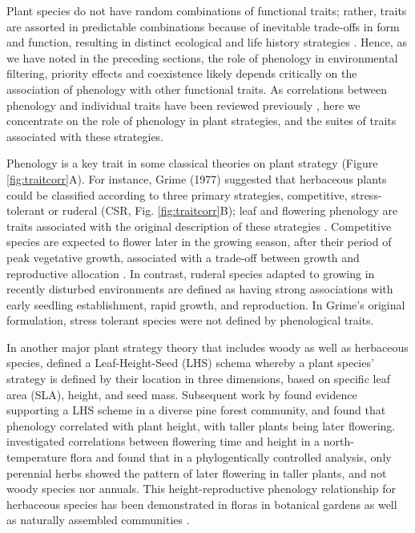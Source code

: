 \documentclass[11pt]{article}
\begin{document}
Plant species do not have random combinations of functional traits; rather, traits are assorted in predictable combinations because of inevitable trade-offs in form and function, resulting in distinct ecological and life history strategies \citep{stearns1998evolution,adler2014functional,westoby2002plant}. Hence, as we have noted in the preceding sections, the role of phenology in environmental filtering, priority effects and coexistence likely depends critically on the association of phenology with other functional traits. As correlations between phenology and individual traits have been reviewed previously \citep[e.g.][]{wolkovich2014aob,segrestin2020reproductive}, here we concentrate on the role of phenology in plant strategies, and the suites of traits associated with these strategies.

Phenology is a key trait in some classical theories on plant strategy (Figure \ref{fig:traitcorr}A). For instance, Grime (1977) suggested that herbaceous plants could be classified according to three primary strategies, competitive, stress-tolerant or ruderal (CSR, Fig. \ref{fig:traitcorr}B); leaf and flowering phenology are traits associated with the original description of these strategies \citep[see Table 2 in][]{grime1977evidence}. Competitive species are expected to flower later in the growing season, after their period of peak vegetative growth, associated with a trade-off between growth and reproductive allocation \citep{law1979cost}. In contrast, ruderal species adapted to growing in recently disturbed environments are defined as having strong associations with early seedling establishment, rapid growth, and reproduction. In Grime’s original formulation, stress tolerant species were not defined by phenological traits.

In another major plant strategy theory that includes woody as well as herbaceous species, \citet{westoby1998leaf} defined a Leaf-Height-Seed (LHS) schema whereby a plant species’ strategy is defined by their location in three dimensions, based on specific leaf area (SLA), height, and seed mass. Subsequent work by \citet{laughlin2010multi} found evidence supporting a LHS scheme in a diverse pine forest community, and found that phenology correlated with plant height, with taller plants being later flowering. \citet{bolmgren2008time} investigated correlations between flowering time and height in a north-temperature flora and found that in a phylogentically controlled analysis, only perennial herbs showed the pattern of later flowering in taller plants, and not woody species nor annuals. This height-reproductive phenology relationship for herbaceous species has been demonstrated in floras in botanical gardens \citep{sporbert2022functional, horbach2023flowering} as well as naturally assembled communities \citep{du2010trade, liu2021linkage}.
\end{document}
